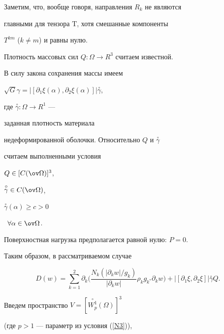Заметим, что, вообще говоря, направления $R_k$ не являются


главными для тензора $\mathrm T$, хотя смешанные компоненты


$T^{km}$ ($k\neq m$) и равны нулю.





Плотность массовых сил $Q:\Omega \to R^3$ считаем известной. 


В силу закона сохранения массы имеем


$\sqrt G \gamma={| [\partial_1 \xi (\alpha),\partial_2 \xi (\alpha) ] |}


\overset{\circ}{\gamma}$,


где $\overset{\circ}{\gamma}{}:\Omega \to R^1$ ---


заданная плотность материала 


недеформированной оболочки. Относительно $Q$ и $\overset{\circ}{\gamma}$


считаем выполненными условия


$Q \in [C(\ov \Omega) ]^3$,


$\overset{\circ}{\gamma}{}\in C(\ov \Omega)$,


$\overset{\circ}{\gamma}{}(\alpha) \ge c >0$ 


\, $\forall \alpha\in \ov \Omega$.


Поверхностная нагрузка предполагается равной нулю: $P=0$.





Таким образом, в рассматриваемом случае


$$




D(w)=\sum_{k=1}^{2} \partial_k \bigg( \frac {N_k (|\partial_k w | / g_k )} 


{|\partial_k w |} \rho_k g_{k^*} \partial_k w \bigg)+


| [\partial_1 \xi,\partial_2 \xi ] | \overset{\circ}{\gamma}{}Q. 






$$





Введем пространство $V=[\overset{\circ}{W^1_p}{}(\Omega ) ]^3$


(где $p>1$ --- параметр из условия (\ref{N3})),


